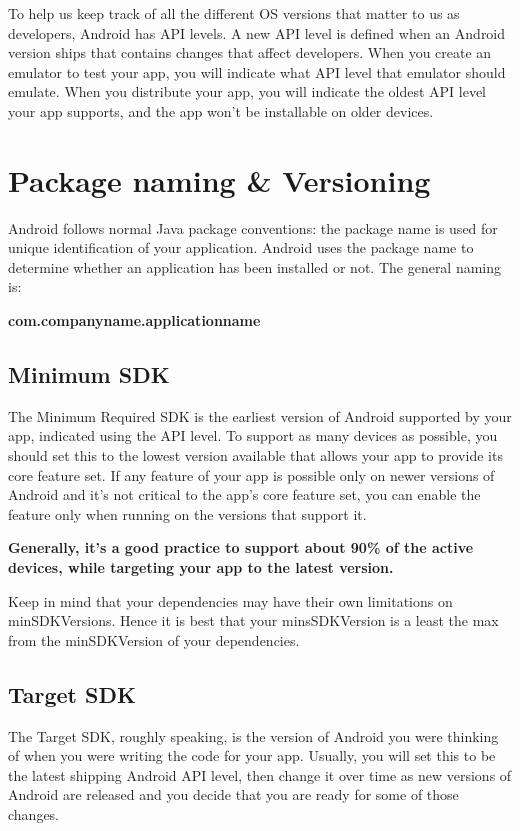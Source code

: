 To help us keep track of all the different OS versions that matter to us as developers, Android has API levels.
A new API level is defined when an Android version ships that contains changes that affect developers.
When you create an emulator to test your app, you will indicate what API level that emulator should emulate.
When you distribute your app, you will indicate the oldest API level your app supports, and the app won't be installable on older devices.

\section{Package naming \& Versioning}
Android follows normal Java package conventions: the package name is used for unique identification of your application.
Android uses the package name to determine whether an application has been installed or not.
The general naming is:

\begin{center}
	\textbf{com.companyname.applicationname}
\end{center}

\subsection{Minimum SDK}
The Minimum Required SDK is the earliest version of Android supported by your app, indicated using the API level.
To support as many devices as possible, you should set this to the lowest version available that allows your app to provide its core feature set.
If any feature of your app is possible only on newer versions of Android and it's not critical to the app's core feature set, you can enable the feature only when running on the versions that support it.

\textbf{Generally, it’s a good practice to support about 90\% of the active devices, while targeting your app to the latest version.}

Keep in mind that your dependencies may have their own limitations on minSDKVersions.
Hence it is best that your minsSDKVersion is a least the max from the minSDKVersion of your dependencies.

\subsection{Target SDK}
The Target SDK, roughly speaking, is the version of Android you were thinking of when you were writing the code for your app.
Usually, you will set this to be the latest shipping Android API level, then change it over time as new versions of Android are released and you decide that you are ready for some of those changes.

